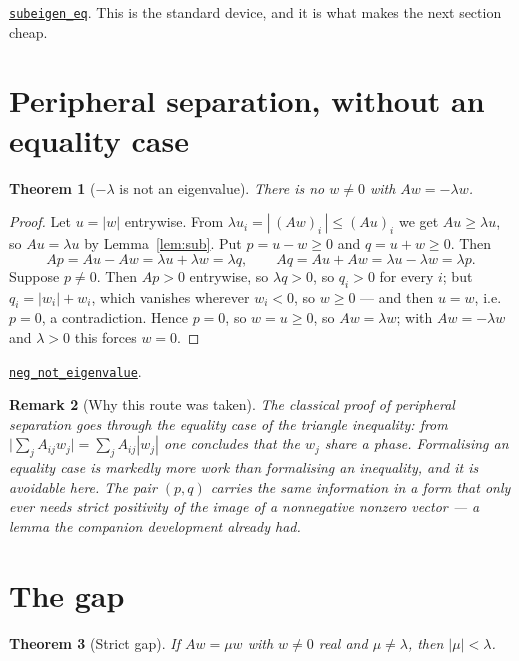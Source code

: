 \documentclass[11pt]{article}
\newtheorem{theorem}{Theorem}[section]
\newtheorem{remark}[theorem]{Remark}
\theoremstyle{definition}
\newcommand{\anchor}{ac8979631c1541b059b3c10f590ca174b0b5f6be}
\newcommand{\osline}[3]{%
  \href{https://github.com/lluiseriksson/THE-ERIKSSON-PROGRAMME/blob/\anchor/YangMills/OS/#1.lean\#L#2}{\nolinkurl{#3}}}
\begin{document}
\osline{PerronGap}{114}{subeigen\_eq}.  This is the standard device, and it
is what makes the next section cheap.

\section{Peripheral separation, without an equality case}

\begin{theorem}[$-\lambda$ is not an eigenvalue]\label{thm:periph}
There is no $w\neq0$ with $Aw=-\lambda w$.
\end{theorem}

\begin{proof}
Let $u=|w|$ entrywise.  From $\lambda u_i=|\,(Aw)_i\,|\le(Au)_i$ we get
$Au\ge\lambda u$, so $Au=\lambda u$ by Lemma~\ref{lem:sub}.  Put $p=u-w\ge0$ and
$q=u+w\ge0$.  Then
\[
  Ap = Au - Aw = \lambda u + \lambda w = \lambda q,
  \qquad
  Aq = Au + Aw = \lambda u - \lambda w = \lambda p .
\]
Suppose $p\neq0$.  Then $Ap>0$ entrywise, so $\lambda q>0$, so $q_i>0$ for every
$i$; but $q_i=|w_i|+w_i$, which vanishes wherever $w_i<0$, so $w\ge0$ --- and
then $u=w$, i.e.\ $p=0$, a contradiction.  Hence $p=0$, so $w=u\ge0$, so
$Aw=\lambda w$; with $Aw=-\lambda w$ and $\lambda>0$ this forces $w=0$.
\end{proof}

\osline{PerronGap}{163}{neg\_not\_eigenvalue}.

\begin{remark}[Why this route was taken]
The classical proof of peripheral separation goes through the equality case of
the triangle inequality: from $\bigl|\sum_j A_{ij}w_j\bigr|=\sum_j
A_{ij}|w_j|$ one concludes that the $w_j$ share a phase.  Formalising an
equality case is markedly more work than formalising an inequality, and it is
avoidable here.  The pair $(p,q)$ carries the same information in a form that
only ever needs \emph{strict positivity of the image of a nonnegative nonzero
vector} --- a lemma the companion development already had.
\end{remark}

\section{The gap}

\begin{theorem}[Strict gap]\label{thm:gap}
If $Aw=\mu w$ with $w\neq0$ real and $\mu\neq\lambda$, then $|\mu|<\lambda$.
\end{theorem}
\end{document}
